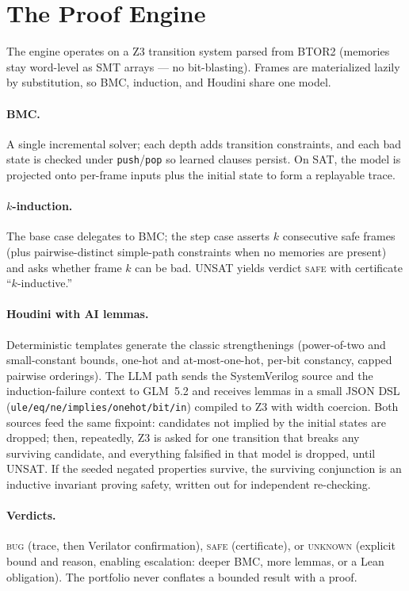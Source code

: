\documentclass[11pt]{article}
\begin{document}
\section{The Proof Engine}\label{sec:engine}

The engine operates on a Z3 transition system parsed from BTOR2 (memories
stay word-level as SMT arrays --- no bit-blasting). Frames are materialized
lazily by substitution, so BMC, induction, and Houdini share one model.

\paragraph{BMC.} A single incremental solver; each depth adds transition
constraints, and each bad state is checked under \texttt{push}/\texttt{pop}
so learned clauses persist. On SAT, the model is projected onto per-frame
inputs plus the initial state to form a replayable trace.

\paragraph{$k$-induction.} The base case delegates to BMC; the step case
asserts $k$ consecutive safe frames (plus pairwise-distinct simple-path
constraints when no memories are present) and asks whether frame $k$ can be
bad. UNSAT yields verdict \textsc{safe} with certificate ``$k$-inductive.''

\paragraph{Houdini with AI lemmas.} Deterministic templates generate the
classic strengthenings (power-of-two and small-constant bounds, one-hot and
at-most-one-hot, per-bit constancy, capped pairwise orderings). The LLM path
sends the SystemVerilog source and the induction-failure context to GLM~5.2
and receives lemmas in a small JSON DSL
(\texttt{ule/eq/ne/implies/onehot/bit/in}) compiled to Z3 with width
coercion. Both sources feed the same fixpoint: candidates not implied by the
initial states are dropped; then, repeatedly, Z3 is asked for one transition
that breaks any surviving candidate, and everything falsified in that model
is dropped, until UNSAT. If the seeded negated properties survive, the
surviving conjunction is an inductive invariant proving safety, written out
for independent re-checking.

\paragraph{Verdicts.} \textsc{bug} (trace, then Verilator confirmation),
\textsc{safe} (certificate), or \textsc{unknown} (explicit bound and reason,
enabling escalation: deeper BMC, more lemmas, or a Lean obligation). The
portfolio never conflates a bounded result with a proof.
\end{document}
